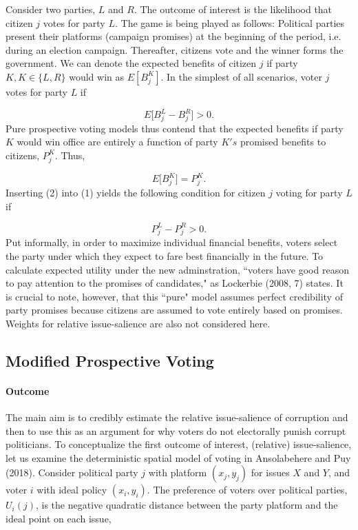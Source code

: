 \documentclass[11pt]{article}
\begin{document}
Consider two parties, $L$ and $R$. The outcome of interest is the likelihood that citizen $j$ votes for party $L$. The game is being played as follows: Political parties present their platforms (campaign promises) at the beginning of the period, i.e. during an election campaign. Thereafter, citizens vote and the winner forms the government. We can denote the expected benefits of citizen $j$ if party $K, K \in \{L, R\}$ would win as $E[B_j^K]$. In the simplest of all scenarios, voter $j$ votes for party $L$ if

\begin{equation}
E\bigg[B_j^L - B_j^R\bigg] > 0.
\end{equation}
Pure prospective voting models thus contend that the expected benefits if party $K$ would win office are entirely a function of party $K's$ promised benefits to citizens, $P_j^K$. Thus,

\begin{equation}
E\bigg[B_j^K\bigg] = P_j^K.
\end{equation}
Inserting (2) into (1) yields the following condition for citizen $j$ voting for party $L$ if

\begin{equation}
P_j^L - P_j^R > 0.
\end{equation}
Put informally, in order to maximize individual financial benefits, voters select the party under which they expect to fare best financially in the future. To calculate expected utility under the new adminstration, “voters have good reason to pay attention to the promises of candidates," as Lockerbie (2008, 7) states. It is crucial to note, however, that this “pure" model assumes perfect credibility of party promises because citizens are assumed to vote entirely based on promises. Weights for relative issue-salience are also not considered here.

\subsection{Modified Prospective Voting}
\paragraph{Outcome}
The main aim is to credibly estimate the relative issue-salience of corruption and then to use this as an argument for why voters do not electorally punish corrupt politicians. To conceptualize the first outcome of interest, (relative) issue-salience, let us examine the deterministic spatial model of voting in Ansolabehere and Puy (2018). Consider political party $j$ with platform $(x_j, y_j)$ for issues $X$ and $Y$, and voter $i$ with ideal policy $(x_i, y_i)$. The preference of voters over political parties, $U_i(j)$, is the negative quadratic distance between the party platform and the ideal point on each issue,
\end{document}
